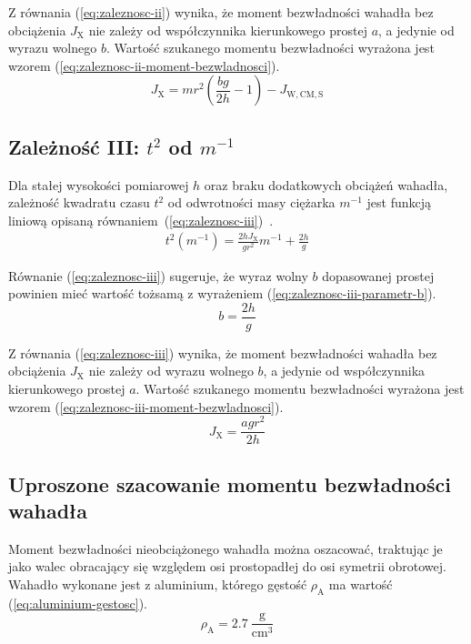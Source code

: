 \documentclass[twocolumn, a4paper, polish, 10pt]{article}
\newcommand{\JX}{\ensuremath{ J_{\mathrm{X}} }}
\newcommand{\JwCmS}{\ensuremath{ J_{\mathrm{W,CM,S}} }}
\begin{document}
Z równania (\ref{eq:zaleznosc-ii}) wynika, że moment bezwładności wahadła bez obciążenia $\JX$ nie zależy od współczynnika kierunkowego prostej $a$, a jedynie od wyrazu wolnego $b$.
Wartość szukanego momentu bezwładności wyrażona jest wzorem (\ref{eq:zaleznosc-ii-moment-bezwladnosci}).
\begin{equation}
    \JX = m r^2 \left( \frac{b g}{2h} - 1 \right) - \JwCmS
\label{eq:zaleznosc-ii-moment-bezwladnosci}
\end{equation}

\subsection{Zależność III: \texorpdfstring{$t^2$}{t²} od \texorpdfstring{$m^{-1}$}{1/m}}
Dla stałej wysokości pomiarowej $h$ oraz braku dodatkowych obciążeń wahadła, zależność kwadratu czasu $t^2$ od odwrotności masy ciężarka $m^{-1}$ jest funkcją liniową opisaną równaniem~(\ref{eq:zaleznosc-iii})~\cite{pracownia-fizyczna-m7}.
\begin{equation}
\begin{split}
    t^2(m^{-1}) 
    = \frac{2 h \JX}{g r^2} m^{-1}
    + \frac{2h}{g}
\label{eq:zaleznosc-iii}
\end{split}
\end{equation}

Równanie (\ref{eq:zaleznosc-iii}) sugeruje, że wyraz wolny $b$ dopasowanej prostej powinien mieć wartość tożsamą z wyrażeniem (\ref{eq:zaleznosc-iii-parametr-b}).
\begin{equation}
    b = \frac{2h}{g}
\label{eq:zaleznosc-iii-parametr-b}
\end{equation}

Z równania (\ref{eq:zaleznosc-iii}) wynika, że moment bezwładności wahadła bez obciążenia $\JX$ nie zależy od wyrazu wolnego $b$, a jedynie od współczynnika kierunkowego prostej $a$.
Wartość szukanego momentu bezwładności wyrażona jest wzorem (\ref{eq:zaleznosc-iii-moment-bezwladnosci}).
\begin{equation}
    \JX = \frac{a g r^2}{2h}
\label{eq:zaleznosc-iii-moment-bezwladnosci}
\end{equation}

\subsection{Uproszone szacowanie momentu bezwładności wahadła}
Moment bezwładności nieobciążonego wahadła można oszacować, traktując je jako walec obracający się względem osi prostopadłej do osi symetrii obrotowej.
Wahadło wykonane jest z aluminium, którego gęstość $\rho_{\mathrm{A}}$ ma wartość (\ref{eq:aluminium-gestosc}).
\begin{equation}
    \rho_{\mathrm{A}} = 2.7~\mathrm{ \frac{g}{cm^3} } 
    \label{eq:aluminium-gestosc}
\end{equation}
\end{document}
